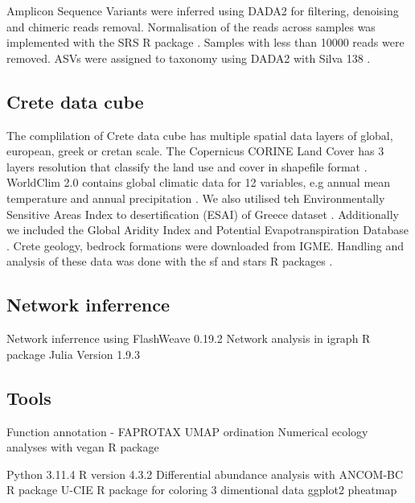 \documentclass[unnumsec,webpdf,contemporary,large]{oup-authoring-template}%
\theoremstyle{thmstyleone}%
\theoremstyle{thmstyletwo}%
\theoremstyle{thmstylethree}%
\begin{document}
Amplicon Sequence Variants were inferred using DADA2 \cite{Callahan2016} for 
filtering, denoising and chimeric reads removal. Normalisation of the reads
across samples was implemented with the SRS R package \cite{Beule2020}. Samples
with less than 10000 reads were removed. ASVs were assigned to taxonomy using 
DADA2 with Silva 138 \cite{Quast2012}.

\subsection{Crete data cube}\label{data}

The complilation of Crete data cube has multiple spatial data layers of global,
european, greek or cretan scale. 
The Copernicus CORINE Land Cover has 3 layers resolution that classify the land
use and cover in shapefile format \cite{CLC2023}. 
WorldClim 2.0 contains global climatic data for 12 variables, e.g annual mean
temperature and annual precipitation \cite{Fick2017}.
We also utilised teh Environmentally Sensitive Areas Index to desertification (ESAI) 
of Greece dataset \cite{KARAMESOUTI2018266}. Additionally we included the 
Global Aridity Index and Potential Evapotranspiration Database \cite{zomer2022version}.
Crete geology, bedrock formations were downloaded from IGME.
Handling and analysis of these data was done with the sf and stars R packages \cite{Pebesma2023}.
\subsection{Network inferrence}\label{network_inferrence}

Network inferrence using FlashWeave 0.19.2 \cite{Tackmann2019}
Network analysis in igraph R package \cite{Csardi2006}
Julia Version 1.9.3 \cite{Julia-2017}

\subsection{Tools}\label{tools}
Function annotation - FAPROTAX \cite{Louca2016}
UMAP ordination \cite{mcinnes2018umap-software}
Numerical ecology analyses with vegan R package \cite{vegan}

Python 3.11.4
R version 4.3.2 \cite{rcoreteam}
Differential abundance analysis with ANCOM-BC R package \cite{Lin2020,Lin2023}
U-CIE R package for coloring 3 dimentional data \cite{Koutrouli2022}
ggplot2 \cite{ggplot22016}
pheatmap \cite{Kolde2019}
\end{document}
